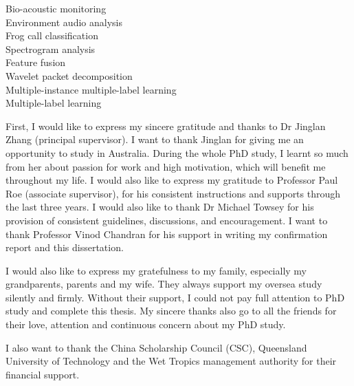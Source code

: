 \begin{keywords}
Bio-acoustic monitoring \\
Environment audio analysis \\
Frog call classification \\
Spectrogram analysis \\
Feature fusion \\
Wavelet packet decomposition \\
Multiple-instance multiple-label learning \\
Multiple-label learning \\
 
\end{keywords}

\begin{ack}
First, I would like to express my sincere gratitude and thanks to Dr Jinglan Zhang (principal supervisor). I want to thank Jinglan for giving me an opportunity to study in Australia. During the whole PhD study, I learnt so much from her about passion for work and high motivation, which will benefit me throughout my life. I would also like to express my gratitude to Professor Paul Roe (associate supervisor), for his consistent instructions and supports through the last three years. I would also like to thank Dr Michael Towsey for his provision of consistent guidelines, discussions, and encouragement. I want to thank Professor Vinod Chandran for his support in writing my confirmation report and this dissertation. 

I would also like to express my gratefulness to my family, especially my grandparents, parents and my wife. They always support my oversea study silently and firmly. Without their support, I could not pay full attention to PhD study and complete this thesis. My sincere thanks also go to all the friends for their love, attention and continuous concern about my PhD study.

I also want to thank the China Scholarship Council (CSC), Queensland University of Technology and the Wet Tropics management authority for their financial support. 

\end{ack}





\afterpreface

